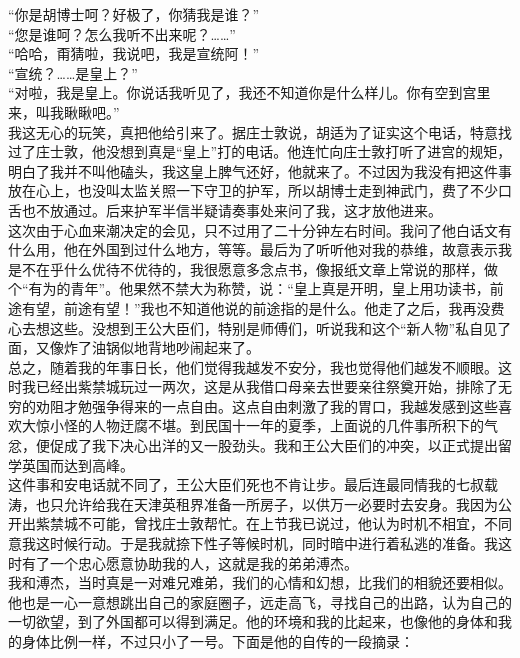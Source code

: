 “你是胡博士呵？好极了，你猜我是谁？”\\

“您是谁呵？怎么我听不出来呢？……”\\

“哈哈，甭猜啦，我说吧，我是宣统阿！”\\

“宣统？……是皇上？”\\

“对啦，我是皇上。你说话我听见了，我还不知道你是什么样儿。你有空到宫里来，叫我瞅瞅吧。”\\

我这无心的玩笑，真把他给引来了。据庄士敦说，胡适为了证实这个电话，特意找过了庄士敦，他没想到真是“皇上”打的电话。他连忙向庄士敦打听了进宫的规矩，明白了我并不叫他磕头，我这皇上脾气还好，他就来了。不过因为我没有把这件事放在心上，也没叫太监关照一下守卫的护军，所以胡博士走到神武门，费了不少口舌也不放通过。后来护军半信半疑请奏事处来问了我，这才放他进来。\\

这次由于心血来潮决定的会见，只不过用了二十分钟左右时间。我问了他白话文有什么用，他在外国到过什么地方，等等。最后为了听听他对我的恭维，故意表示我是不在乎什么优待不优待的，我很愿意多念点书，像报纸文章上常说的那样，做个“有为的青年”。他果然不禁大为称赞，说：“皇上真是开明，皇上用功读书，前途有望，前途有望！”我也不知道他说的前途指的是什么。他走了之后，我再没费心去想这些。没想到王公大臣们，特别是师傅们，听说我和这个“新人物”私自见了面，又像炸了油锅似地背地吵闹起来了。\\

总之，随着我的年事日长，他们觉得我越发不安分，我也觉得他们越发不顺眼。这时我已经出紫禁城玩过一两次，这是从我借口母亲去世要亲往祭奠开始，排除了无穷的劝阻才勉强争得来的一点自由。这点自由刺激了我的胃口，我越发感到这些喜欢大惊小怪的人物迂腐不堪。到民国十一年的夏季，上面说的几件事所积下的气忿，便促成了我下决心出洋的又一股劲头。我和王公大臣们的冲突，以正式提出留学英国而达到高峰。\\

这件事和安电话就不同了，王公大臣们死也不肯让步。最后连最同情我的七叔载涛，也只允许给我在天津英租界准备一所房子，以供万一必要时去安身。我因为公开出紫禁城不可能，曾找庄士敦帮忙。在上节我已说过，他认为时机不相宜，不同意我这时候行动。于是我就捺下性子等候时机，同时暗中进行着私逃的准备。我这时有了一个忠心愿意协助我的人，这就是我的弟弟溥杰。\\

我和溥杰，当时真是一对难兄难弟，我们的心情和幻想，比我们的相貌还要相似。他也是一心一意想跳出自己的家庭圈子，远走高飞，寻找自己的出路，认为自己的一切欲望，到了外国都可以得到满足。他的环境和我的比起来，也像他的身体和我的身体比例一样，不过只小了一号。下面是他的自传的一段摘录：\\

